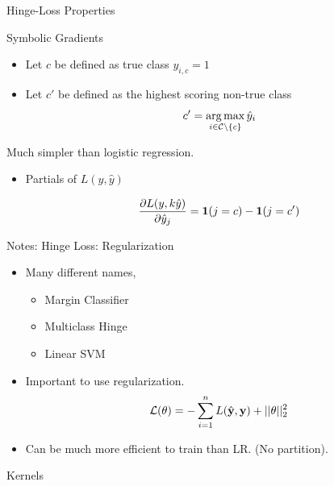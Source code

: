 \documentclass{beamer}
\begin{document}
\begin{frame}{Hinge-Loss Properties}
  
\end{frame}


\begin{frame}{Symbolic Gradients}

  \begin{itemize}
  \item   Let $c$ be defined as true class $y_{i, c} = 1$  
  \item   Let $c'$ be defined as the highest scoring non-true class 
    \[c' = \argmax_{i \in \mcC \setminus\{c\}} \hat{y}_i \] 
  \end{itemize}
  
  Much simpler than logistic regression.

  \begin{itemize}
  \item Partials of $L(y, \hat{y})$

  \[ \frac{\partial L(y,k \hat{y})}{\partial \hat{y}_j} = \mathbf{1}(j = c) - \mathbf{1}(j = c')  \]

   \end{itemize}
\end{frame}


\begin{frame}{Notes: Hinge Loss: Regularization}
  \begin{itemize}
  \item   Many different names,
  \begin{itemize}
  \item Margin Classifier
  \item Multiclass Hinge
  \item Linear SVM
  \end{itemize}

  \item Important to use regularization.  
  \[ \mathcal{L}(\theta) = - \sum_{i=1}^n L(\hat{\mathbf{y}}, \mathbf{y}) + ||\theta||^2_2\] 

  \item Can be much more efficient to train than LR. (No partition).

  \end{itemize}
\end{frame}


\begin{frame}{Kernels}
  
\end{frame}
\end{document}
